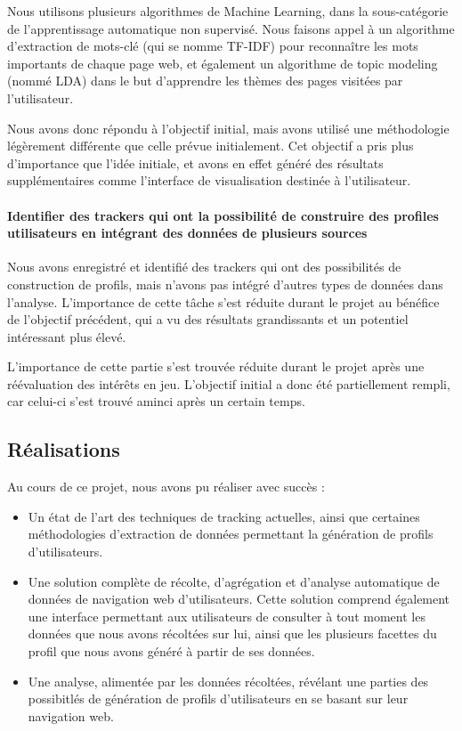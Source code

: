 		Nous utilisons plusieurs algorithmes de Machine Learning, dans la sous-catégorie de l'apprentissage automatique non supervisé. Nous faisons appel à un algorithme d'extraction de mots-clé (qui se nomme \gls{TF-IDF}) pour reconnaître les mots importants de chaque page web, et également un algorithme de topic modeling (nommé \gls{LDA}) dans le but d'apprendre les thèmes des pages visitées par l'utilisateur.
	
		Nous avons donc répondu à l'objectif initial, mais avons utilisé une méthodologie légèrement différente que celle prévue initialement. Cet objectif a pris plus d'importance que l'idée initiale, et avons en effet généré des résultats supplémentaires comme l'interface de visualisation destinée à l'utilisateur.

	\paragraph{Identifier des trackers qui ont la possibilité de construire des profiles utilisateurs en intégrant des données de plusieurs sources}

		Nous avons enregistré et identifié des trackers qui ont des possibilités de construction de profils, mais n'avons pas intégré d'autres types de données dans l'analyse. L'importance de cette tâche s'est réduite durant le projet au bénéfice de l'objectif précédent, qui a vu des résultats grandissants et un potentiel intéressant plus élevé.

		L'importance de cette partie s'est trouvée réduite durant le projet après une réévaluation des intérêts en jeu. L'objectif initial a donc été partiellement rempli, car celui-ci s'est trouvé aminci après un certain temps.

	\subsection{Réalisations}

		Au cours de ce projet, nous avons pu réaliser avec succès :
		\begin{itemize}
			\item Un état de l'art des techniques de tracking actuelles, ainsi que certaines méthodologies d'extraction de données permettant la génération de profils d'utilisateurs.
			\item Une solution complète de récolte, d'agrégation et d'analyse automatique de données de navigation web d'utilisateurs. Cette solution comprend également une interface permettant aux utilisateurs de consulter à tout moment les données que nous avons récoltées sur lui, ainsi que les plusieurs facettes du profil que nous avons généré à partir de ses données.
			\item Une analyse, alimentée par les données récoltées, révélant une parties des possibitlés de génération de profils d'utilisateurs en se basant sur leur navigation web.
		\end{itemize}

